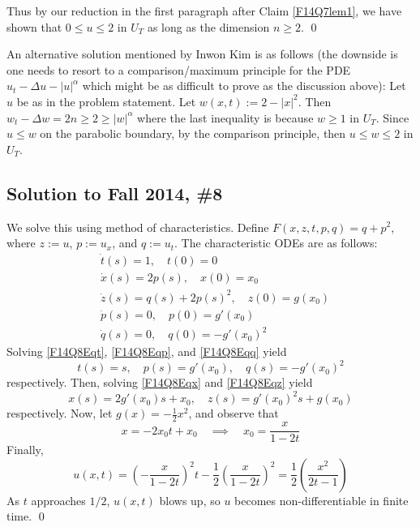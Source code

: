 Thus by our reduction in the first paragraph after Claim \ref{F14Q7lem1}, we have shown that $0 \leq u \leq 2$ in $U_{T}$ as long as the dimension $n \geq 2$.
\hfill\qed

\begin{rem}
An alternative solution mentioned by Inwon Kim is as follows (the downside is one needs to resort to a comparison/maximum principle for the PDE $u_{t} - \Delta u- |u|^{\alpha}$
which might be as difficult to prove as the discussion above):
Let $u$ be as in the problem statement. Let $w(x, t) := 2 - |x|^{2}$. Then
$w_{t} - \Delta w = 2n \geq 2 \geq |w|^{\alpha}$ where the last inequality is because $w \geq 1$ in $U_{T}$.
Since $u \leq w$ on the parabolic boundary, by the comparison principle, then $u \leq w \leq 2$ in $U_{T}$.
\end{rem}

\subsection*{Solution to Fall 2014, \#8}
\label{F14Q8}

We solve this using method of characteristics. Define $F(x,z,t,p,q) = q + p^2$, where $z:=u$, $p:= u_x$, and $q := u_t$. The characteristic ODEs are as follows:
\begin{align}
\label{F14Q8Eqt} &\dot t(s) = 1, \quad t(0) = 0 \\
\label{F14Q8Eqx} &\dot x(s) = 2p(s), \quad x(0) = x_0 \\
\label{F14Q8Eqz} &\dot z(s) = q(s) + 2p(s)^2, \quad z(0) = g(x_0) \\
\label{F14Q8Eqp} &\dot p(s) = 0, \quad p(0) = g'(x_0) \\
\label{F14Q8Eqq} &\dot q(s) = 0, \quad q(0) = -g'(x_0)^2
\end{align}
Solving \eqref{F14Q8Eqt}, \eqref{F14Q8Eqp}, and \eqref{F14Q8Eqq} yield
\[
t(s) = s, \quad p(s) = g'(x_0), \quad q(s) = -g'(x_0)^2
\]
respectively. Then, solving \eqref{F14Q8Eqx} and \eqref{F14Q8Eqz} yield
\[
x(s) = 2g'(x_0)s + x_0, \quad z(s) = g'(x_0)^2 s + g(x_0)
\]
respectively. Now, let $g(x) = -\frac{1}{2} x^2$, and observe that
\[
x = -2x_0 t + x_0 \quad \implies \quad x_0 = \frac{x}{1-2t}
\]
Finally,
\[
u(x,t) = \left( -\frac{x}{1-2t} \right)^2 t - \frac{1}{2} \left( \frac{x}{1-2t} \right)^2 = \frac{1}{2} \left( \frac{x^2}{2t-1} \right)
\]
As $t$ approaches $1/2$, $u(x,t)$ blows up, so $u$ becomes non-differentiable in finite time. \hfill \qed
